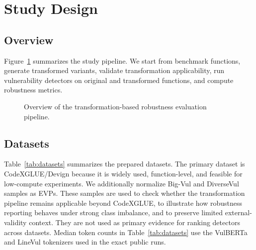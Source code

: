 \documentclass[a4paper,fleqn]{cas-dc}
\begin{document}
\section{Study Design}

\subsection{Overview}

Figure~\ref{fig:pipeline} summarizes the study pipeline. We start from
benchmark functions, generate transformed variants, validate transformation
applicability, run vulnerability detectors on original and transformed
functions, and compute robustness metrics.

\begin{figure}
  \centering
  \resizebox{\textwidth}{!}{}
  \caption{Overview of the transformation-based robustness evaluation pipeline.}
  \label{fig:pipeline}
\end{figure}

\subsection{Datasets}

Table~\ref{tab:datasets} summarizes the prepared datasets. The primary dataset
is CodeXGLUE/Devign because it is widely used, function-level, and feasible for
low-compute experiments. We additionally normalize Big-Vul and DiverseVul
samples as EVPs. These samples are used to check whether
the transformation pipeline remains applicable beyond CodeXGLUE, to illustrate
how robustness reporting behaves under strong class imbalance, and to preserve
limited external-validity context. They are not used as primary evidence for
ranking detectors across datasets.
Median token counts in Table~\ref{tab:datasets} use the VulBERTa and LineVul
tokenizers used in the exact public runs.

\begin{table}[t]
  \centering
  \caption{Prepared dataset statistics after normalization.}
  \label{tab:datasets}
\end{table}
\end{document}
